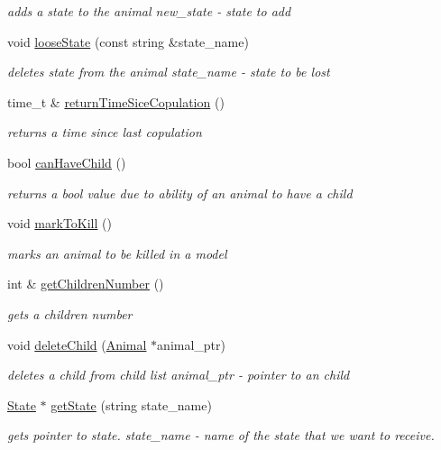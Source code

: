 \begin{DoxyCompactItemize}
\begin{DoxyCompactList}\small\item\em adds a state to the animal  new\+\_\+state -\/ state to add \end{DoxyCompactList}\item 
void \hyperlink{class_animal_aa8cb8cb6c83b686d8076115c2dc1d5de}{loose\+State} (const string \&state\+\_\+name)
\begin{DoxyCompactList}\small\item\em deletes state from the animal  state\+\_\+name -\/ state to be lost \end{DoxyCompactList}\item 
time\+\_\+t \& \hyperlink{class_animal_aadf3c770f5b4795704d20e4e779db60e}{return\+Time\+Sice\+Copulation} ()
\begin{DoxyCompactList}\small\item\em returns a time since last copulation \end{DoxyCompactList}\item 
bool \hyperlink{class_animal_a79e7309613ba6206cd669f8bb6dfea68}{can\+Have\+Child} ()
\begin{DoxyCompactList}\small\item\em returns a bool value due to ability of an animal to have a child \end{DoxyCompactList}\item 
void \hyperlink{class_animal_a4843dae3d10111748918c52ef4ff0d18}{mark\+To\+Kill} ()
\begin{DoxyCompactList}\small\item\em marks an animal to be killed in a model \end{DoxyCompactList}\item 
int \& \hyperlink{class_animal_a0d801911499ea1f1fd9c35370f796bb6}{get\+Children\+Number} ()
\begin{DoxyCompactList}\small\item\em gets a children number \end{DoxyCompactList}\item 
void \hyperlink{class_animal_a159dffe71ed72c6229b17c6e360ca6a1}{delete\+Child} (\hyperlink{class_animal}{Animal} $\ast$animal\+\_\+ptr)
\begin{DoxyCompactList}\small\item\em deletes a child from child list  animal\+\_\+ptr -\/ pointer to an child \end{DoxyCompactList}\item 
\hyperlink{class_state}{State} $\ast$ \hyperlink{class_animal_a18d4928a07297d4611e3a4e4197c3a8b}{get\+State} (string state\+\_\+name)
\begin{DoxyCompactList}\small\item\em gets pointer to state.  state\+\_\+name -\/ name of the state that we want to receive. \end{DoxyCompactList}\end{DoxyCompactItemize}

